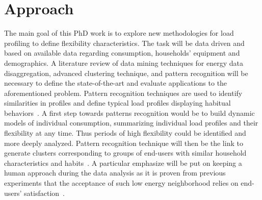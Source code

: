 \documentclass[fleqn,a4paper,twoside,10pt]{article}
\begin{document}

\section{Approach}
	
 	The main goal of this PhD work is to explore new methodologies for load profiling to define flexibility characteristics. 
 	The task will be data driven and based on available data regarding consumption, households' equipment and demographics. 
 	A literature review of data mining techniques for energy data disaggregation, advanced clustering technique, and pattern recognition will be necessary to define the state-of-the-art and evaluate applications to the aforementioned problem. 
 	Pattern recognition techniques are used to identify similarities in profiles and define typical load profiles displaying habitual behaviors~\cite{Abreu2012}. 
 	A first step towards patterns recognition would be to build dynamic models of individual consumption, summarizing individual load profiles and their flexibility at any time. 
 	Thus periods of high flexibility could be identified and more deeply analyzed.
 	Pattern recognition technique will then be the link to generate clusters corresponding to groups of end-users with similar household characteristics and habits~\cite{albert2013}. 
 	A particular emphasize will be put on keeping a human approach during the data analysis as it is proven from previous experiments that the acceptance of such low energy neighborhood relies on end-users' satisfaction~\cite{Mlecnik2012}.
 	
\end{document}
